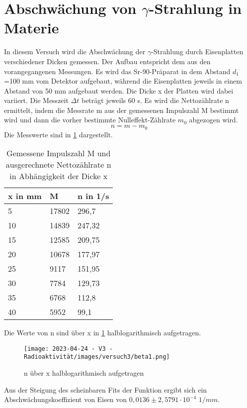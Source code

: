 \documentclass[../protokoll.tex]{subfiles}
\begin{document}
\section{Abschwächung von \texorpdfstring{$\gamma$}{Gamma}-Strahlung in Materie}\label{sec:Abschwächung Gamma-Strahlung}
In diesem Versuch wird die Abschwächung der $\gamma$-Strahlung durch Eisenplatten verschiedener Dicken gemessen. Der Aufbau entspricht dem aus den vorangegangenen Messungen. Es wird das Sr-90-Präparat in dem Abstand $d_1$=100 mm vom Detektor aufgebaut, während die Eisenplatten jeweils in einem Abstand von 50 mm aufgebaut werden. Die Dicke x der Platten wird dabei variiert. Die Messzeit $\Delta t$ beträgt jeweils 60 s. Es wird die Nettozählrate n ermittelt, indem die Messrate m aus der gemessenen Impulszahl M bestimmt wird und dann die vorher bestimmte Nulleffekt-Zählrate $m_0$ abgezogen wird.
\begin{equation}
        n=m-m_0
\end{equation}
Die Messwerte sind in \ref{tab3} dargestellt.
\begin{table}[h]
\centering
\begin{tabular}{|l|l|l|}
\hline
x in mm & M     & n in 1/s \\ \hline
5       & 17802 & 296,7    \\ \hline
10      & 14839 & 247,32   \\ \hline
15      & 12585 & 209,75   \\ \hline
20      & 10678 & 177,97   \\ \hline
25      & 9117  & 151,95   \\ \hline
30      & 7784  & 129,73   \\ \hline
35      & 6768  & 112,8    \\ \hline
40      & 5952  & 99,1     \\ \hline
\end{tabular}
\caption{Gemessene Impulszahl M und ausgerechnete Nettozählrate n in Abhängigkeit der Dicke x}
\label{tab3}
\end{table}
Die Werte von n sind über x in \ref{beta1} halblogarithmisch aufgetragen.
\begin{figure}
    \centering
    \texttt{[image: 2023-04-24 - V3 - Radioaktivität/images/versuch3/beta1.png]}
    \caption{n über x halblogarithmisch aufgetragen}
    \label{beta1}
\end{figure}
Aus der Steigung des scheinbaren Fits der Funktion ergibt sich ein Abschwächungskoeffizient von Eisen von $0,0136 \pm 2,5791 \cdot 10^{-4}$ $1/mm$.
\end{document}

